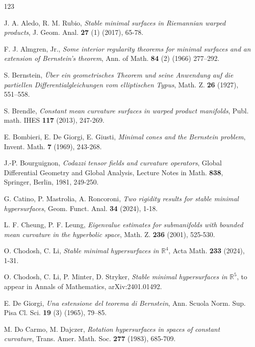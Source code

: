 \documentclass[amssymb,amstex,amsmath,11pt]{article}
\numberwithin{equation}{section}
\theoremstyle{plain}
\theoremstyle{definition}
\theoremstyle{remark}
\begin{document}
\begin{thebibliography}{123}

 J. A. Aledo, R. M. Rubio, \textit{Stable minimal surfaces in Riemannian warped products}, J. Geom. Anal. {\bf 27} (1) (2017), 65-78.

 F. J. Almgren, Jr., \textit{Some interior regularity theorems for minimal surfaces and an extension of Bernstein’s theorem}, Ann. of Math. {\bf 84} (2) (1966) 277–292.

 S. Bernstein, \textit{Über ein geometrisches Theorem und seine Anwendung auf die partiellen Differentialgleichungen vom elliptischen Typus}, Math. Z. {\bf 26} (1927), 551–558.

 S. Brendle, \textit{Constant mean curvature surfaces in warped product manifolds}, Publ. math. IHES {\bf 117} (2013), 247-269.

 E. Bombieri, E. De Giorgi, E. Giusti, \textit{Minimal cones and the Bernstein problem}, Invent. Math. {\bf 7} (1969), 243-268.


 J.-P. Bourguignon, \textit{Codazzi tensor fields and curvature operators}, Global Differential Geometry and Global Analysis, Lecture Notes in Math. {\bf 838}, Springer, Berlin, 1981, 249-250.

 G. Catino, P. Mastrolia, A. Roncoroni, \textit{Two rigidity results for stable minimal hypersurfaces}, Geom. Funct. Anal. {\bf 34} (2024), 1-18.

 L. F. Cheung, P. F. Leung, \textit{Eigenvalue estimates for submanifolds with bounded mean curvature in the hyperbolic space}, Math. Z. {\bf 236} (2001), 525-530.

 O. Chodosh, C. Li, \textit{Stable minimal hypersurfaces in $\mathbb{R}^4$}, Acta Math. {\bf 233} (2024), 1-31.

 O. Chodosh, C. Li, P. Minter, D. Stryker, \textit{Stable minimal hypersurfaces in $\mathbb{R}^5$}, to appear in Annals of Mathematics, arXiv:2401.01492.

 E. De Giorgi, \textit{Una estensione del teorema di Bernstein}, Ann. Scuola Norm. Sup. Pisa Cl. Sci. {\bf 19} (3) (1965), 79–85.

 M. Do Carmo, M. Dajczer, \textit{Rotation hypersurfaces in spaces of constant curvature}, Trans. Amer. Math. Soc. {\bf 277} (1983), 685-709.


\end{thebibliography}
\end{document}
